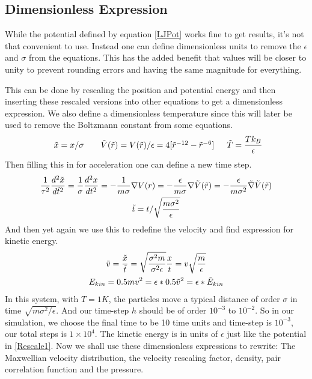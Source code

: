 \documentclass[a4paper,12pt]{article} %
\begin{document}
\subsection{Dimensionless Expression}
While the potential defined by equation \eqref{LJPot} works fine to get results, it's not that convenient to use. Instead one can define dimensionless units to remove the $\epsilon$ and $\sigma$ from the equations. This has the added benefit that values will be closer to unity to prevent rounding errors and having the same magnitude for everything.\par
This can be done by rescaling the position and potential energy and then inserting these rescaled versions into other equations to get a dimensionless expression. We also define a dimensionless temperature since this will later be used to remove the Boltzmann constant from some equations.
\begin{equation}
\label{Rescale1}
\begin{array}{cc} \Tilde{x} = x/\sigma \ \ \  & \Tilde{V}(\Tilde{r}) = V(\Tilde{r})/\epsilon = 4[\Tilde{r}^{-12} - {\Tilde{r}^{-6}}] \\ \end{array} \ \ \ \Tilde{T} = \frac{Tk_B}{\epsilon}
\end{equation}
Then filling this in for acceleration one can define a new time step.
\begin{equation}
\begin{gathered}
    \frac{1}{\tau^2}\frac{d^2\Tilde{x}}{d\Tilde{t}^2}= \frac{1}{\sigma}\frac{d^2x}{dt^2} = -\frac{1}{m\sigma}\nabla V(r) = -\frac{\epsilon}{m\sigma}\nabla \Tilde{V}(\Tilde{r}) = - \frac{\epsilon}{m\sigma^2}\Tilde{\nabla}\Tilde{V}(\Tilde{r})\\
    \Tilde{t} = t/\sqrt{\frac{m\sigma^2}{\epsilon}}
\end{gathered}    
\end{equation}
And then yet again we use this to redefine the velocity and find expression for kinetic energy.
\begin{equation}
\begin{gathered}
    \Tilde{v} =  \frac{\Tilde{x}}{\Tilde{t}} = \sqrt{\frac{\sigma^2m}{\sigma^2\epsilon}} \frac{x}{t} = v\sqrt{\frac{m}{\epsilon}}\\
    E_{kin} = 0.5mv^2 = \epsilon * 0.5\Tilde{v}^2 = \epsilon * \Tilde{E}_{kin}
\end{gathered}    
\end{equation}
In this system, with $T=1K$, the particles move a typical distance of order $\sigma$ in time $\sqrt{m{\sigma}^2/\epsilon}$. And our time-step $h$ should be of order $10^{-3}$ to $10^{-2}$. So in our simulation, we choose the final time to be 10 time units and time-step is $10^{-3}$, our total steps is $1\times10^4$. The kinetic energy is in units of $\epsilon$ just like the potential in \eqref{Rescale1}. Now we shall use these dimensionless expressions to rewrite: The Maxwellian velocity distribution, the velocity rescaling factor, density, pair correlation function and the pressure.
\end{document}
